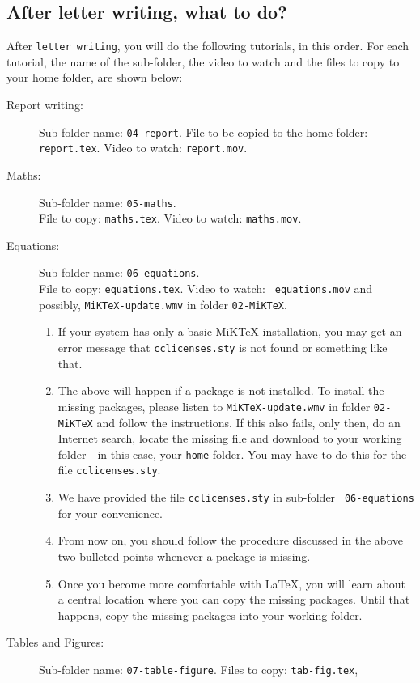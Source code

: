 \documentclass[11pt]{article}
\newenvironment{enumcpt}{\begin{enumerate} \topsep 0pt \partopsep 0pt 
                        \parsep 0pt
                        \itemsep 0pt \leftmargin -1in \rightmargin 0pt
                        }{\end{enumerate}}
\begin{document}
\begin{multicols}{2}
\section{After letter writing, what to do?}
After {\tt letter writing}, you will do the following tutorials, in
this order.  For each tutorial, the name of the sub-folder, the video
to watch and the files to copy to your home folder, are shown below:
\begin{description}
\item [Report writing:]
Sub-folder name: {\tt 04-report}.
File to be copied to the home folder: {\tt report.tex}.  Video to
watch: {\tt report.mov}. 
\item [Maths:]
Sub-folder name: {\tt 05-maths}. \\
File to copy: {\tt maths.tex}.  Video to watch: {\tt maths.mov}.
\item [Equations:]
Sub-folder name: {\tt 06-equations}. \\
File to copy: {\tt equations.tex}.  Video to watch: {\tt
  equations.mov} and possibly, {\tt MiKTeX-update.wmv} in
  folder {\tt 02-MiKTeX}.
\begin{enumcpt}
\item If your system has only a basic MiKTeX installation, you may
  get an error message that {\tt cclicenses.sty} is not found or
  something like that.
\item The above will happen if a package is not installed.  To install
  the missing packages, please listen to {\tt MiKTeX-update.wmv} in
  folder {\tt 02-MiKTeX} and follow the instructions.
  If this also fails, only then, do an Internet
  search, locate the missing file and download to your working folder
  - in this case, your {\tt home} folder.  You may have to do this for
  the file {\tt cclicenses.sty}.
\item We have provided the file {\tt cclicenses.sty} in sub-folder {\tt
    06-equations} for your convenience.
\item From now on, you should follow the procedure discussed in the
  above two bulleted points whenever a package is
  missing.
\item Once you become more comfortable with \LaTeX, you will learn
  about a central location where you can copy the missing packages.
  Until that happens, copy the missing packages into your working
  folder. 
\end{enumcpt}
\item [Tables and Figures:]
Sub-folder name: {\tt 07-table-figure}. 
Files to copy: {\tt tab-fig.tex}, {\tt
}
\end{description}
\end{multicols}
\end{document}
